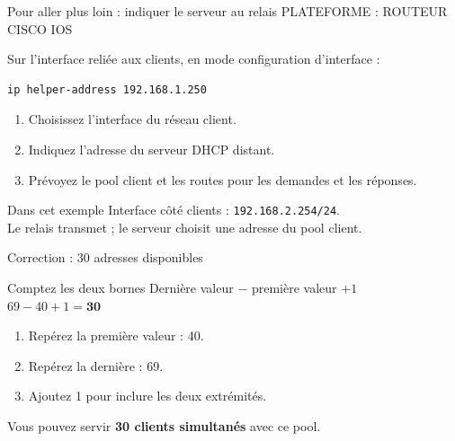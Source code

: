 \documentclass[aspectratio=169,11pt]{beamer}
\newcommand{\question}[1]{\begin{beamercolorbox}[rounded=true,sep=12pt]{block body}\Large\textbf{#1}\end{beamercolorbox}}
\newcommand{\etiquette}[1]{{\color{or}\small\MakeUppercase{#1}}}
\newenvironment{schema}{%
  \begin{beamercolorbox}[sep=8pt,rounded=true]{block body}
  \centering\begin{tikzpicture}[>=Stealth]
}{\end{tikzpicture}\end{beamercolorbox}}
\begin{document}
\begin{frame}[fragile]{Pour aller plus loin : indiquer le serveur au relais}
  \etiquette{Plateforme : routeur Cisco IOS}\par
  Sur l'interface reliée aux clients, en mode configuration d'interface :
  \begin{lstlisting}[style=webcode,language={}]
ip helper-address 192.168.1.250
\end{lstlisting}
  \begin{enumerate}
    \item Choisissez l'interface du réseau client.
    \item Indiquez l'adresse du serveur DHCP distant.
    \item Prévoyez le pool client et les routes pour les demandes et les réponses.
  \end{enumerate}
  \begin{block}{Dans cet exemple}
    Interface côté clients : \texttt{192.168.2.254/24}.\\
    Le relais transmet ; le serveur choisit une adresse du pool client.
  \end{block}
\end{frame}




\begin{frame}{Correction : 30 adresses disponibles}
  \begin{block}{Comptez les deux bornes}
    Dernière valeur $-$ première valeur $+ 1$\\[2mm]
    $69 - 40 + 1 = \mathbf{30}$
  \end{block}
  \begin{enumerate}
    \item Repérez la première valeur : 40.
    \item Repérez la dernière : 69.
    \item Ajoutez 1 pour inclure les deux extrémités.
  \end{enumerate}
  Vous pouvez servir \textbf{30 clients simultanés} avec ce pool.
\end{frame}
\end{document}
